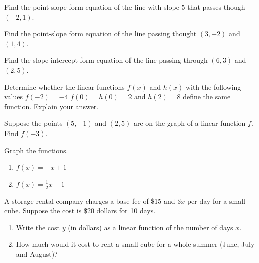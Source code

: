 \begin{exercise}

Find the point-slope form equation of the line with slope \(5\) that
passes though \((-2, 1)\).

\end{exercise}
\vspace*{6\baselineskip}
\begin{exercise}

Find the point-slope form equation of the line passing thought
\((3, -2)\) and \((1,4)\).

\end{exercise}
\vspace*{6\baselineskip}
\begin{exercise}

Find the slope-intercept form equation of the line passing through
\((6, 3)\) and \((2, 5)\).

\end{exercise}
\vspace*{6\baselineskip}
\begin{exercise}

Determine whether the linear functions \(f(x)\) and \(h(x)\) with the
following values \(f(-2)=-4\) \(f(0)=h(0)=2\) and \(h(2)=8\) define the
same function. Explain your answer.

\end{exercise}
\vspace*{6\baselineskip}
\begin{exercise}

Suppose the points \((5, -1)\) and \((2, 5)\) are on the graph of a
linear function \(f\). Find \(f(-3)\).

\end{exercise}
\vspace*{6\baselineskip}
\begin{exercise}

Graph the functions.

\begin{enumerate}
\item
  \(f(x)=-x + 1\)
\item
  \(f(x)=\frac{1}{2}x - 1\)
\end{enumerate}

\end{exercise}
\vspace*{2\baselineskip}

\begin{exercise}

A storage rental company charges a base fee of \$15 and \$\(x\) per day
for a small cube. Suppose the cost is \$20 dollars for 10 days.

\begin{enumerate}
\item
  Write the cost \(y\) (in dollars) as a linear function of the number
  of days \(x\).
\item
  How much would it cost to rent a small cube for a whole summer (June,
  July and August)?
\end{enumerate}

\end{exercise}
\vspace*{2\baselineskip}

